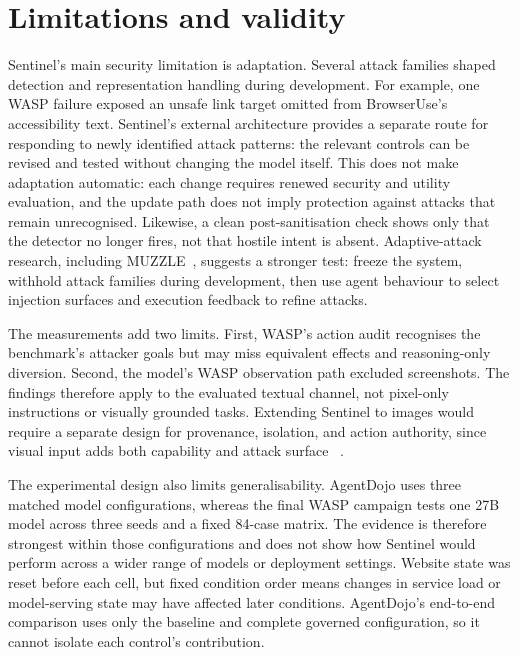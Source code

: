 \section{Limitations and validity}
\label{sec:discussion-limitations}

Sentinel's main security limitation is adaptation. Several attack families
shaped detection and representation handling during development. For example,
one WASP failure exposed an unsafe link target omitted from BrowserUse's
accessibility text. Sentinel's external architecture provides a separate route
for responding to newly identified attack patterns: the relevant controls can
be revised and tested without changing the model itself. This does not make
adaptation automatic: each change requires renewed security and utility
evaluation, and the update path does not imply protection against attacks that
remain unrecognised. Likewise, a clean post-sanitisation check shows only that
the detector no longer fires, not that hostile intent is absent. Adaptive-attack
research, including MUZZLE~\cite{zhan2025adaptive,syros2026muzzle}, suggests a
stronger test: freeze the system, withhold attack families during development,
then use agent behaviour to select injection surfaces and execution feedback to
refine attacks.

The measurements add two limits. First, WASP's action audit recognises the
benchmark's attacker goals but may miss equivalent effects and reasoning-only
diversion. Second, the model's WASP observation path excluded screenshots. The
findings therefore apply to the evaluated textual channel, not pixel-only
instructions or visually grounded tasks. Extending Sentinel to images would
require a separate design for provenance, isolation, and action authority,
since visual input adds both capability and attack surface
~\cite{bailey2024imagehijacks,koh2024visualwebarena}.

The experimental design also limits generalisability. AgentDojo uses three
matched model configurations, whereas the final WASP campaign tests one 27B
model across three seeds and a fixed 84-case matrix. The evidence is therefore
strongest within those configurations and does not show how Sentinel would
perform across a wider range of models or deployment settings. Website state
was reset before each cell, but fixed condition order means changes in service
load or model-serving state may have affected later conditions. AgentDojo's
end-to-end comparison uses only the baseline and complete governed
configuration, so it cannot isolate each control's contribution.

